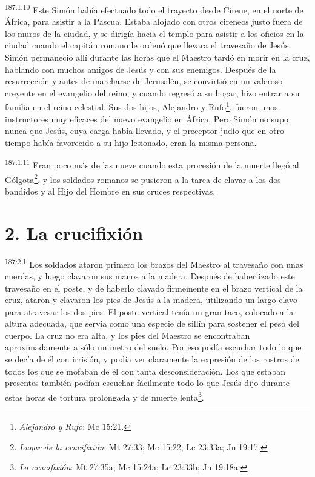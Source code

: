 \par
\textsuperscript{187:1.10} Este Simón había efectuado todo el trayecto desde Cirene, en el norte de África, para asistir a la Pascua. Estaba alojado con otros cireneos justo fuera de los muros de la ciudad, y se dirigía hacia el templo para asistir a los oficios en la ciudad cuando el capitán romano le ordenó que llevara el travesaño de Jesús. Simón permaneció allí durante las horas que el Maestro tardó en morir en la cruz, hablando con muchos amigos de Jesús y con sus enemigos. Después de la resurrección y antes de marcharse de Jerusalén, se convirtió en un valeroso creyente en el evangelio del reino, y cuando regresó a su hogar, hizo entrar a su familia en el reino celestial. Sus dos hijos, Alejandro y Rufo\footnote{\textit{Alejandro y Rufo}: Mc 15:21.}, fueron unos instructores muy eficaces del nuevo evangelio en África. Pero Simón no supo nunca que Jesús, cuya carga había llevado, y el preceptor judío que en otro tiempo había favorecido a su hijo lesionado, eran la misma persona.

\par
\textsuperscript{187:1.11} Eran poco más de las nueve cuando esta procesión de la muerte llegó al Gólgota\footnote{\textit{Lugar de la crucifixión}: Mt 27:33; Mc 15:22; Lc 23:33a; Jn 19:17.}, y los soldados romanos se pusieron a la tarea de clavar a los dos bandidos y al Hijo del Hombre en sus cruces respectivas.

\section*{2. La crucifixión}
\par
\textsuperscript{187:2.1} Los soldados ataron primero los brazos del Maestro al travesaño con unas cuerdas, y luego clavaron sus manos a la madera. Después de haber izado este travesaño en el poste, y de haberlo clavado firmemente en el brazo vertical de la cruz, ataron y clavaron los pies de Jesús a la madera, utilizando un largo clavo para atravesar los dos pies. El poste vertical tenía un gran taco, colocado a la altura adecuada, que servía como una especie de sillín para sostener el peso del cuerpo. La cruz no era alta, y los pies del Maestro se encontraban aproximadamente a sólo un metro del suelo. Por eso podía escuchar todo lo que se decía de él con irrisión, y podía ver claramente la expresión de los rostros de todos los que se mofaban de él con tanta desconsideración. Los que estaban presentes también podían escuchar fácilmente todo lo que Jesús dijo durante estas horas de tortura prolongada y de muerte lenta\footnote{\textit{La crucifixión}: Mt 27:35a; Mc 15:24a; Lc 23:33b; Jn 19:18a.}.

